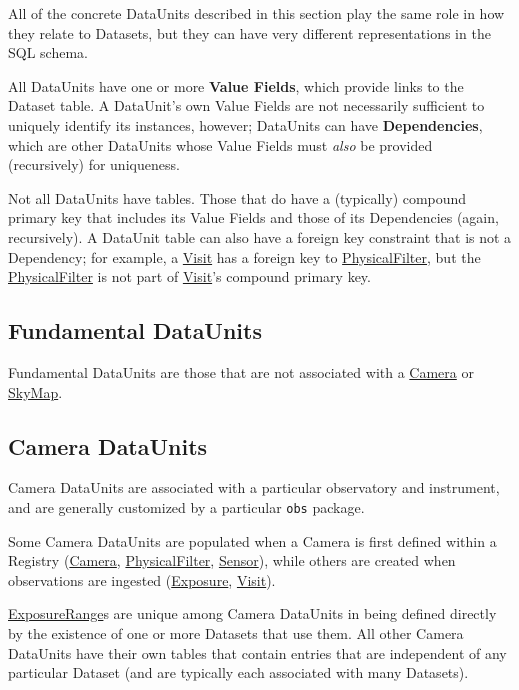 \documentclass[DM,toc]{lsstdoc}
\newcommand{\unitref}[1]{\hyperref[unit:#1]{#1}}
\newcommand{\unitinc}[1]{}
\begin{document}
All of the concrete DataUnits described in this section play the same role in how they relate to Datasets, but they can have very different representations in the SQL schema.

All DataUnits have one or more \textbf{Value Fields}, which provide links to the Dataset table.
A DataUnit's own Value Fields are not necessarily sufficient to uniquely identify its instances, however; DataUnits can have \textbf{Dependencies}, which are other DataUnits whose Value Fields must \emph{also} be provided (recursively) for uniqueness.

Not all DataUnits have tables.
Those that do have a (typically) compound primary key that includes its Value Fields and those of its Dependencies (again, recursively).
A DataUnit table can also have a foreign key constraint that is not a Dependency; for example, a \unitref{Visit} has a foreign key to \unitref{PhysicalFilter}, but the \unitref{PhysicalFilter} is not part of \unitref{Visit}'s compound primary key.

\subsection{Fundamental DataUnits}
\label{sec:fundamental-dataunits}

Fundamental DataUnits are those that are not associated with a \unitref{Camera} or \unitref{SkyMap}.

\unitinc{Label}
\unitinc{AbstractFilter}
\unitinc{SkyPix}

\subsection{Camera DataUnits}
\label{sec:camera-dataunits}

Camera DataUnits are associated with a particular observatory and instrument, and are generally customized by a particular \texttt{obs} package.

Some Camera DataUnits are populated when a Camera is first defined within a Registry (\unitref{Camera}, \unitref{PhysicalFilter}, \unitref{Sensor}), while others are created when observations are ingested (\unitref{Exposure}, \unitref{Visit}).

\unitref{ExposureRange}s are unique among Camera DataUnits in being defined directly by the existence of one or more Datasets that use them.
All other Camera DataUnits have their own tables that contain entries that are independent of any particular Dataset (and are typically each associated with many Datasets).
\end{document}

